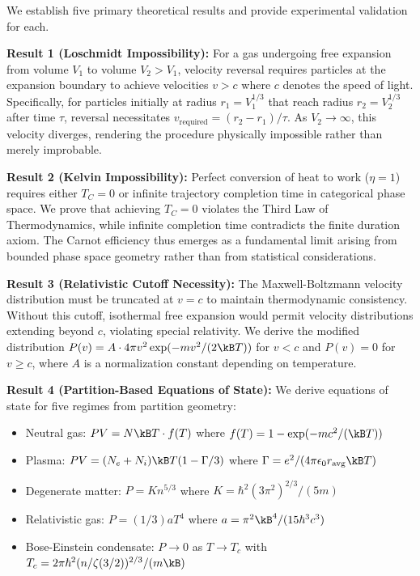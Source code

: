 We establish five primary theoretical results and provide experimental validation for each.

\textbf{Result 1 (Loschmidt Impossibility):} For a gas undergoing free expansion from volume $V_1$ to volume $V_2 > V_1$, velocity reversal requires particles at the expansion boundary to achieve velocities $v > c$ where $c$ denotes the speed of light. Specifically, for particles initially at radius $r_1 = V_1^{1/3}$ that reach radius $r_2 = V_2^{1/3}$ after time $\tau$, reversal necessitates $v_{\text{required}} = (r_2 - r_1)/\tau$. As $V_2 \to \infty$, this velocity diverges, rendering the procedure physically impossible rather than merely improbable.

\textbf{Result 2 (Kelvin Impossibility):} Perfect conversion of heat to work ($\eta = 1$) requires either $T_C = 0$ or infinite trajectory completion time in categorical phase space. We prove that achieving $T_C = 0$ violates the Third Law of Thermodynamics, while infinite completion time contradicts the finite duration axiom. The Carnot efficiency thus emerges as a fundamental limit arising from bounded phase space geometry rather than from statistical considerations.

\textbf{Result 3 (Relativistic Cutoff Necessity):} The Maxwell-Boltzmann velocity distribution must be truncated at $v = c$ to maintain thermodynamic consistency. Without this cutoff, isothermal free expansion would permit velocity distributions extending beyond $c$, violating special relativity. We derive the modified distribution $P(v) = A \cdot 4\pi v^2 \exp(-mv^2/(2\kB T))$ for $v < c$ and $P(v) = 0$ for $v \geq c$, where $A$ is a normalization constant depending on temperature.

\textbf{Result 4 (Partition-Based Equations of State):} We derive equations of state for five regimes from partition geometry:
\begin{itemize}[noitemsep]
    \item Neutral gas: $PV = N\kB T \cdot f(T)$ where $f(T) = 1 - \exp(-mc^2/(\kB T))$
    \item Plasma: $PV = (N_e + N_i)\kB T(1 - \Gamma/3)$ where $\Gamma = e^2/(4\pi\epsilon_0 r_{\text{avg}} \kB T)$
    \item Degenerate matter: $P = K n^{5/3}$ where $K = \hbar^2(3\pi^2)^{2/3}/(5m)$
    \item Relativistic gas: $P = (1/3)aT^4$ where $a = \pi^2\kB^4/(15\hbar^3 c^3)$
    \item Bose-Einstein condensate: $P \to 0$ as $T \to T_c$ with $T_c = 2\pi\hbar^2(n/\zeta(3/2))^{2/3}/(m\kB)$
\end{itemize}

